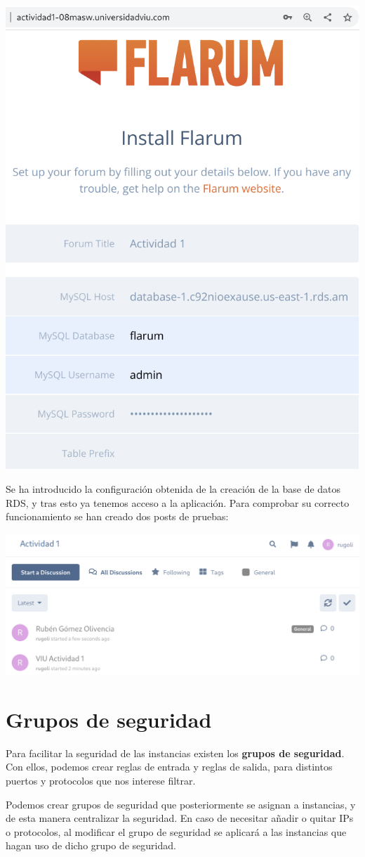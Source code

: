 \documentclass{\ClassPath/viu-tfm-template}
\begin{document}
\begin{center}
    \includegraphics[frame,width=0.5\linewidth]{img/installer.png}
\end{center}

Se ha introducido la configuración obtenida de la creación de la base de datos RDS, y tras esto ya tenemos acceso a la aplicación. Para comprobar su correcto funcionamiento se han creado dos posts de pruebas:

\begin{center}
    \includegraphics[frame,width=0.9\linewidth]{img/flarum.png}
\end{center}




\chapter{Grupos de seguridad}
Para facilitar la seguridad de las instancias existen los \textbf{grupos de seguridad}. Con ellos, podemos crear reglas de entrada y reglas de salida, para distintos puertos y protocolos que nos interese filtrar.

Podemos crear grupos de seguridad que posteriormente se asignan a instancias, y de esta manera centralizar la seguridad. En caso de necesitar añadir o quitar IPs o protocolos, al modificar el grupo de seguridad se aplicará a las instancias que hagan uso de dicho grupo de seguridad.
\end{document}
